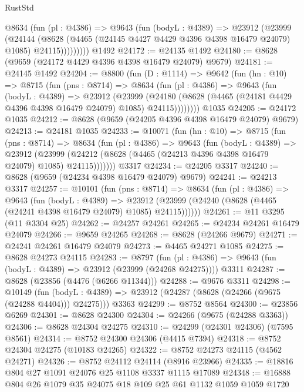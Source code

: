 \begin{lexlean}{RustStd}
\begin{coremodule}
          @8634
            (fun (pl : @4386) =>
            @9643
              (fun (bodyL : @4389) =>
              @23912
                (@23999
                  (@24144
                    (@8628
                      (@4465 (@24145 @4427 @4429 @4396 @4398 @16479 @24079) @1085)
                      @24115)))))))))
    @1492
@24172 := @24135 @1492
@24180 := @8628 (@9659 (@24172 @4429 @4396 @4398 @16479 @24079) @9679)
@24181 := @24145 @1492
@24204 := @8800
    (fun (D : @1114) =>
    @9642
      (fun (hn : @10) =>
      @8715
        (fun (pns : @8714) =>
        @8634
          (fun (pl : @4386) =>
          @9643
            (fun (bodyL : @4389) =>
            @23912
              (@23999
                (@24180 (@8628 (@4465 (@24181 @4429 @4396 @4398 @16479 @24079) @1085) @24115))))))))
    @1035
@24205 := @24172 @1035
@24212 := @8628 (@9659 (@24205 @4396 @4398 @16479 @24079) @9679)
@24213 := @24181 @1035
@24233 := @10071
    (fun (hn : @10) =>
    @8715
      (fun (pns : @8714) =>
      @8634
        (fun (pl : @4386) =>
        @9643
          (fun (bodyL : @4389) =>
          @23912
            (@23999 (@24212 (@8628 (@4465 (@24213 @4396 @4398 @16479 @24079) @1085) @24115)))))))
    @3317
@24234 := @24205 @3317
@24240 := @8628 (@9659 (@24234 @4398 @16479 @24079) @9679)
@24241 := @24213 @3317
@24257 := @10101
    (fun (pns : @8714) =>
    @8634
      (fun (pl : @4386) =>
      @9643
        (fun (bodyL : @4389) =>
        @23912 (@23999 (@24240 (@8628 (@4465 (@24241 @4398 @16479 @24079) @1085) @24115))))))
@24261 := @11 @3295 (@11 @3304 @25)
@24262 := @24257 @24261
@24265 := @24234 @24261 @16479 @24079
@24266 := @9659 @24265
@24268 := @8628 (@24266 @9679)
@24271 := @24241 @24261 @16479 @24079
@24273 := @4465 @24271 @1085
@24275 := @8628 @24273 @24115
@24283 := @8797
    (fun (pl : @4386) => @9643 (fun (bodyL : @4389) => @23912 (@23999 (@24268 @24275))))
    @3311
@24287 := @8628 (@23856 (@4476 (@6266 @11344)))
@24288 := @9676 @3311
@24298 := @10149
    (fun (bodyL : @4389) => @23912 (@24287 (@8628 (@24266 (@9675 (@24288 @4404))) @24275)))
    @3363
@24299 := @8752 @8564
@24300 := @23856 @6269
@24301 := @8628 @24300
@24304 := @24266 (@9675 (@24288 @3363))
@24306 := @8628 @24304 @24275
@24310 := @24299 (@24301 @24306) (@7595 @8561)
@24314 := @8752 @24300 @24306 (@4415 @7394)
@24318 := @8752 @24304 @24275 (@10183 @24265)
@24322 := @8752 @24273 @24115 (@4562 @24271)
@24326 := @8752 @24112 @24114 (@8916 @23966)
@24335 := @18816 @804 @27 @1091 @24076 @25 @1108 @3337 @1115 @17089
@24348 := @16888 @804 @26 @1079 @35 @24075 @18 @109 @25 @61 @1132 @1059 @1059 @1720

\end{coremodule}
\end{lexlean}
